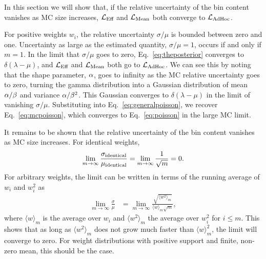 In this section we will show that, if the relative uncertainty of the bin content vanishes as MC size increases, $\mathcal{L}_\textmd{Eff}$ and $\mathcal{L}_{\textmd{Mean}}$ both converge to $\mathcal{L}_{\textmd{AdHoc}}$.

For positive weights $w_i$, the relative uncertainty $\sigma/\mu$ is bounded between zero and one.
Uncertainty as large as the estimated quantity, $\sigma/\mu=1$, occurs if and only if $m=1$.
In the limit that $\sigma/\mu$ goes to zero, Eq.~\eqref{eq:theposterior} converges to $\delta(\lambda - \mu)$, and $\mathcal{L}_\textmd{Eff}$ and $\mathcal{L}_{\textmd{Mean}}$ both go to $\mathcal{L}_{\textmd{AdHoc}}$.
We can see this by noting that the shape parameter, $\alpha$, goes to infinity as the MC relative uncertainty goes to zero, turning the gamma distribution into a Gaussian distribution of mean $\alpha / \beta$ and variance $\alpha / \beta^2$.
This Gaussian converges to $\delta(\lambda-\mu)$ in the limit of vanishing $\sigma/\mu$.
Substituting into Eq.~\eqref{eq:generalpoisson}, we recover Eq.~\eqref{eq:mcpoisson}, which converges to Eq.~\eqref{eq:poisson} in the large MC limit.

It remains to be shown that the relative uncertainty of the bin content vanishes as MC size increases.
For identical weights,
\begin{equation}
\lim_{m\to\infty} \frac{\sigma_{\rm identical}}{\mu_{\rm identical}} = \lim_{m\to\infty} \frac{1}{\sqrt{m}} = 0 .
\end{equation}
For arbitrary weights, the limit can be written in terms of the running average of $w_i$ and $w_i^2$ as
\begin{align}
\lim_{m\to\infty} \frac{\sigma}{\mu} &= \lim_{m\to\infty} \frac{\sqrt{\langle w^2 \rangle_m}}{\langle w\rangle_m\sqrt{m}},
\end{align}
where $\langle w \rangle_m$ is the average over $w_i$ and $\langle w^2 \rangle_m$ the average over $w_i^2$ for $i \leq m$.
This shows that as long as $\langle w^2 \rangle_m$ does not grow much faster than $\langle w \rangle_m^2$, the limit will converge to zero.
For weight distributions with positive support and finite, non-zero mean, this should be the case.
